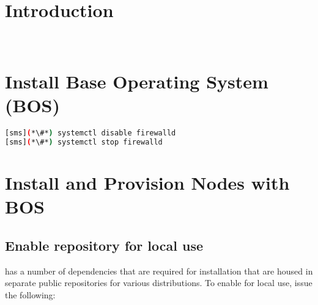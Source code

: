 \documentclass[letterpaper]{article}
\begin{document}
\graphicspath{{common/figures/}}
\thispagestyle{empty}




\newpage
\tableofcontents
\newpage


\section{Introduction} \label{sec:introduction}

 \\








\vspace*{0.2cm}
\section{Install Base Operating System (BOS)}


\begin{lstlisting}[language=bash,keywords={}]
[sms](*\#*) systemctl disable firewalld
[sms](*\#*) systemctl stop firewalld
\end{lstlisting}


\section{Install \xCAT{} and Provision Nodes with BOS} \label{sec:provision_compute_bos}


\subsection{Enable \xCAT{} repository for local use} \label{sec:enable_xcat}


\noindent \xCAT{} has a number of dependencies that are required for
installation that are housed in separate public repositories for various
distributions. To enable for local use, issue the following:
\end{document}
